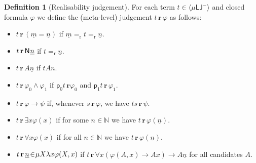 \documentclass[10pt,a4paper]{amsart}
\theoremstyle{plain}
\theoremstyle{definition}
\newtheorem{definition}[definition]{Definition}
\newtheorem{remark}[remark]{Remark}
\renewcommand{\phi}{\varphi}
\newcommand{\oldtodo}[1]{\todo{#1}} %
\newcommand{\red}[1]{{\color{red}#1}}
\newcommand{\anupam}[1]{\todo[color=green]{A: #1}}
\renewcommand{\todo}[1]{}
\renewcommand{\anupam}[1]{}
\newcommand{\todonew}[1]{{\red{TodoNew: #1}}}
\renewcommand{\todonew}[1]{}
\theoremstyle{plain}
\theoremstyle{definition} %
\newcommand{\numeral}[1]{\underline{#1}}
\newcommand{\Nat}{\mathbb{N}}
\newcommand{\closure}[1]{\langle #1 \rangle}
\newcommand{\clomuLJneg}{\closure{\muLJneg}}
\newcommand{\LJ}{\mathsf{LJ}}
\newcommand{\muLJ}{\mu\LJ}
\newcommand{\muLJneg}{\muLJ^-}
\newcommand{\proj}[1]{\mathsf{p}_{#1}}
\newcommand{\projl}{\proj 0}
\newcommand{\projr}{\proj 1}
\newcommand{\reduction}{\mathrm{r}}
\newcommand{\converts}{=_{\reduction}}
\renewcommand{\land}{\wedge}
\newcommand{\limp}{\to}
\newcommand{\hr}[1]{|#1|}
\newcommand{\realises}{\mathbf{r}}
\newcommand{\pNat}{\mathsf{N}}
\newcommand{\pnat}[1]{\pNat\hspace{.05em} #1 }
\begin{document}
\anupam{could formulate all of below with closed terms, by defining a valuation function. Need different metavariables, e.g.\ $u,v,w$, reserving $r,s,t$ for terms of $\clomuLJneg$. Do this later if there is time.}
\begin{definition}
    [Realisability judgement]
    For each term $t\in \clomuLJneg$ and closed formula $\phi$ we define the (meta-level) judgement $t \, \realises\, \phi$ as follows:
\begin{itemize}
    \item $t\, \realises \, (\numeral m = \numeral n)$ if $\numeral m \converts t \converts \numeral n$.
    \item $t \, \realises \, \pnat {\numeral n}$ if $t\converts \numeral n$.
     \item $t\, \realises\, A\numeral n$ if $t A n$.
    \item $t\, \realises\, \phi_0 \land \phi_1$ if $\projl t \, \realises \phi_0$ and $\projr t \, \realises\, \phi_1$.
    \item $t \, \realises\,  \phi \limp \psi $ if, whenever $s\, \realises \, \phi$, we have $ts \, \realises\, \psi$.
    \item $t\, \realises\, \exists x \phi(x)$ if for some $n\in \Nat$ we have $t\, \realises \, \phi(\numeral n)$.
    \item $t\, \realises\,  \forall x \phi(x)$ if for all $n \in \Nat $ we have $t\, \realises\, \phi(\numeral n)$.
    \item $t\, \realises\, \numeral n \hspace{-.15em}\in \hspace{-.2em} \mu X \lambda x \phi(X,x)$ if $t\, \realises \, \forall x (\phi(A,x)\limp Ax) \limp A\numeral n$ for all candidates $A$.
\end{itemize}
\end{definition}


    
\end{document}
